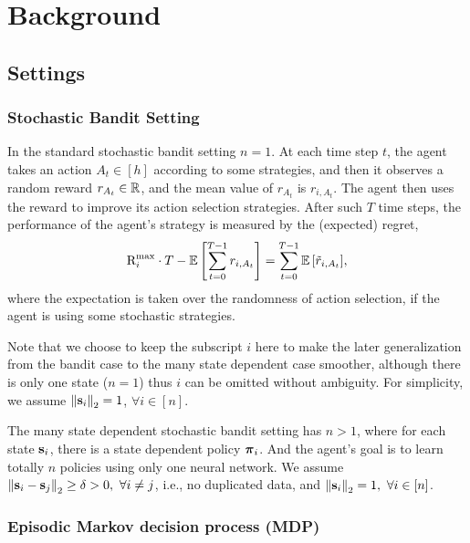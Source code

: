 \section{Background}
\label{sec:background}

\subsection{Settings}
\label{subsec:settings}

\subsubsection{Stochastic Bandit Setting}

In the standard stochastic bandit setting $n = 1$. At each time step $t$, the agent takes an action $A_t \in [h]$ according to some strategies, and then it observes a random reward $r_{A_t} \in {\mathbb{R}}$, and the mean value of $r_{A_t}$ is $r_{i, A_t}$. The agent then uses the reward to improve its action selection strategies. After such $T$ time steps, the performance of the agent's strategy is measured by the (expected) regret,
\begin{equation}
\label{eq:expected_regret}
    {\text{R}}_i^{\max} \cdot T - {\mathbb{E}} \left[ \sum\limits_{t=0}^{T-1}{  r_{i, A_t}  } \right] = \sum\limits_{t=0}^{T-1}{ {\mathbb{E}} \left[ \tilde{r}_{i, A_t} \right] },
\end{equation}
where the expectation is taken over the randomness of action selection, if the agent is using some stochastic strategies.

Note that we choose to keep the subscript $i$ here to make the later generalization from the bandit case to the many state dependent case smoother, although there is only one state ($n = 1$) thus $i$ can be omitted without ambiguity. For simplicity, we assume $\left\| {\mathbf{s}}_{i} \right\|_2 = 1$, $\forall i \in [n]$.

The many state dependent stochastic bandit setting has $n > 1$, where for each state ${\mathbf{s}}_i$, there is a state dependent policy ${\boldsymbol{\pi}}_i$. And the agent's goal is to learn totally $n$ policies using only one neural network. We assume $\left\| {\mathbf{s}}_{i} -  {\mathbf{s}}_{j} \right\|_2 \ge \delta > 0 , \ \forall i \not= j$, i.e., no duplicated data, and $\left\| {\mathbf{s}}_{i} \right\|_2 = 1, \ \forall i \in [n]$.

\subsubsection{Episodic Markov decision process (MDP)}

